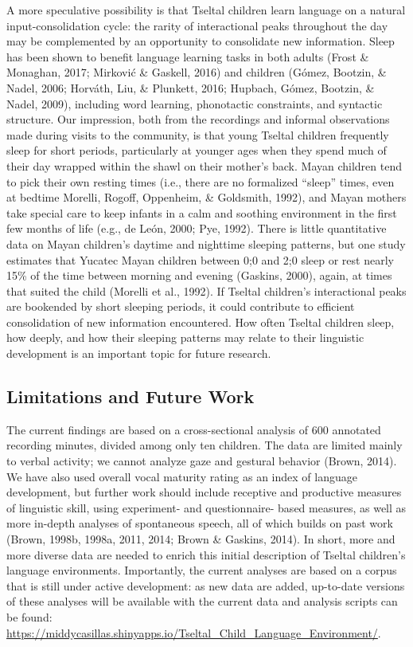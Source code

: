 \documentclass[floatsintext,man]{apa6}
\theoremstyle{definition}
\theoremstyle{definition}
\theoremstyle{definition}
\theoremstyle{remark}
\begin{document}
A more speculative possibility is that Tseltal children learn language
on a natural input-consolidation cycle: the rarity of interactional
peaks throughout the day may be complemented by an opportunity to
consolidate new information. Sleep has been shown to benefit language
learning tasks in both adults (Frost \& Monaghan, 2017; Mirković \&
Gaskell, 2016) and children (Gómez, Bootzin, \& Nadel, 2006; Horváth,
Liu, \& Plunkett, 2016; Hupbach, Gómez, Bootzin, \& Nadel, 2009),
including word learning, phonotactic constraints, and syntactic
structure. Our impression, both from the recordings and informal
observations made during visits to the community, is that young Tseltal
children frequently sleep for short periods, particularly at younger
ages when they spend much of their day wrapped within the shawl on their
mother's back. Mayan children tend to pick their own resting times
(i.e., there are no formalized ``sleep'' times, even at bedtime Morelli,
Rogoff, Oppenheim, \& Goldsmith, 1992), and Mayan mothers take special
care to keep infants in a calm and soothing environment in the first few
months of life (e.g., de León, 2000; Pye, 1992). There is little
quantitative data on Mayan children's daytime and nighttime sleeping
patterns, but one study estimates that Yucatec Mayan children between
0;0 and 2;0 sleep or rest nearly 15\% of the time between morning and
evening (Gaskins, 2000), again, at times that suited the child (Morelli
et al., 1992). If Tseltal children's interactional peaks are bookended
by short sleeping periods, it could contribute to efficient
consolidation of new information encountered. How often Tseltal children
sleep, how deeply, and how their sleeping patterns may relate to their
linguistic development is an important topic for future research.

\subsection{Limitations and Future Work}\label{disc-limfut}

The current findings are based on a cross-sectional analysis of 600
annotated recording minutes, divided among only ten children. The data
are limited mainly to verbal activity; we cannot analyze gaze and
gestural behavior (Brown, 2014). We have also used overall vocal
maturity rating as an index of language development, but further work
should include receptive and productive measures of linguistic skill,
using experiment- and questionnaire- based measures, as well as more
in-depth analyses of spontaneous speech, all of which builds on past
work (Brown, 1998b, 1998a, 2011, 2014; Brown \& Gaskins, 2014). In
short, more and more diverse data are needed to enrich this initial
description of Tseltal children's language environments. Importantly,
the current analyses are based on a corpus that is still under active
development: as new data are added, up-to-date versions of these
analyses will be available with the current data and analysis scripts
can be found:
\url{https://middycasillas.shinyapps.io/Tseltal_Child_Language_Environment/}.
\end{document}
